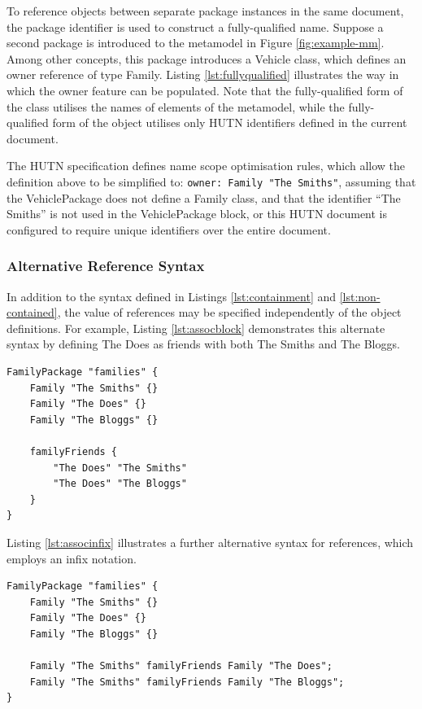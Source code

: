 To reference objects between separate package instances in the same document, the package identifier is used to construct a fully-qualified name. Suppose a second package is introduced to the metamodel in Figure \ref{fig:example-mm}. Among other concepts, this package introduces a Vehicle class, which defines an owner reference of type Family. Listing \ref{lst:fullyqualified} illustrates the way in which the owner feature can be populated. Note that the fully-qualified form of the class utilises the names of elements of the metamodel, while the fully-qualified form of the object utilises only HUTN identifiers defined in the current document.

The HUTN specification defines name scope optimisation rules, which allow the definition above to be simplified to: \texttt{owner: Family "The Smiths"}, assuming that the VehiclePackage does not define a Family class, and that the identifier ``The Smiths'' is not used in the VehiclePackage block, or this HUTN document is configured to require unique identifiers over the entire document.


\subsubsection{Alternative Reference Syntax}
In addition to the syntax defined in Listings \ref{lst:containment} and \ref{lst:non-contained}, the value of references may be specified independently of the object definitions. For example, Listing \ref{lst:assocblock} demonstrates this alternate syntax by defining The Does as friends with both The Smiths and The Bloggs.

\begin{lstlisting}[caption=Using a reference block in HUTN., label=lst:assocblock, language=HutnFamilies]
FamilyPackage "families" {
    Family "The Smiths" {}
    Family "The Does" {}
    Family "The Bloggs" {}
    
    familyFriends {
        "The Does" "The Smiths"
        "The Does" "The Bloggs"
    }
}
\end{lstlisting}

Listing \ref{lst:associnfix} illustrates a further alternative syntax for references, which employs an infix notation. 

\begin{lstlisting}[caption=Using an infix reference in HUTN., label=lst:associnfix, language=HutnFamilies]
FamilyPackage "families" {
    Family "The Smiths" {}
    Family "The Does" {}
    Family "The Bloggs" {}
    
    Family "The Smiths" familyFriends Family "The Does";
    Family "The Smiths" familyFriends Family "The Bloggs";
}
\end{lstlisting}

